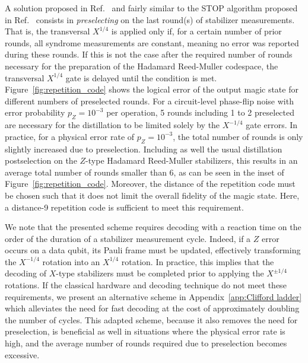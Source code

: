 \documentclass[%
 reprint,
superscriptaddress,
 amsmath,amssymb,
 aps,
]{revtex4-2}
\begin{document}
A solution proposed in Ref.~\cite{litinski2019magic} and fairly similar to the STOP algorithm proposed in Ref.~\cite{chamberland2022building} consists in \textit{preselecting} on the last round(s) of stabilizer measurements. That is, the transversal $X^{1/4}$ is applied only if, for a certain number of prior rounds, all syndrome measurements are constant, meaning no error was reported during these rounds. If this is not the case after the required number of rounds necessary for the preparation of the Hadamard Reed-Muller codespace, the transversal $X^{1/4}$ gate is delayed until the condition is met. Figure~\ref{fig:repetition_code} shows the logical error of the output magic state for different numbers of preselected rounds. For a circuit-level phase-flip noise with error probability $p_Z=10^{-3}$ per operation, 5 rounds including 1 to 2 preselected are necessary for the distillation to be limited solely by the $X^{-1/4}$ gate errors. In practice, for a physical error rate of $p_Z = 10^{-3}$, the total number of rounds is only slightly increased due to preselection. Including as well the usual distillation postselection on the $Z$-type Hadamard Reed-Muller stabilizers, this results in an average total number of rounds smaller than 6, as can be seen in the inset of Figure~\ref{fig:repetition_code}. Moreover, the distance of the repetition code must be chosen such that it does not limit the overall fidelity of the magic state. Here, a distance-9 repetition code is sufficient to meet this requirement.

We note that the presented scheme requires decoding with a reaction time on the order of the duration of a stabilizer measurement cycle. Indeed, if a $Z$ error occurs on a data qubit, its Pauli frame must be updated, effectively transforming the $X^{-1/4}$ rotation into an $X^{1/4}$ rotation. In practice, this implies that the decoding of $X$-type stabilizers must be completed prior to applying the $X^{\pm 1/4}$ rotations. If the classical hardware and decoding technique do not meet these requirements, we present an alternative scheme in Appendix~\ref{app:Clifford ladder} which alleviates the need for fast decoding at the cost of approximately doubling the number of cycles. This adapted scheme, because it also removes the need for preselection, is beneficial as well in situations where the physical error rate is high, and the average number of rounds required due to preselection becomes excessive.\pagebreak
\end{document}
